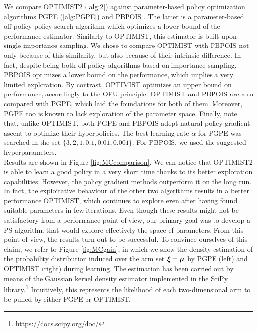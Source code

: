 We compare \gls{OPTIMIST}2 (\ref{alg:2}) against parameter-based policy optimization algorithms \gls{PGPE} (\ref{alg:PGPE}) and \gls{PBPOIS} \cite{metelli2018policy}. The latter is a parameter-based off-policy policy search algorithm which optimizes a lower bound of the performance estimator. Similarly to \gls{OPTIMIST}, this estimator is built upon single importance sampling. We chose to compare \gls{OPTIMIST} with \gls{PBPOIS} not only because of this similarity, but also because of their intrinsic difference. In fact, despite being both off-policy algorithms based on importance sampling, \gls{PBPOIS} optimizes a lower bound on the performance, which implies a very limited exploration. By contrast, \gls{OPTIMIST} optimizes an upper bound on performance, accordingly to the \gls{OFU} principle. \gls{OPTIMIST} and \gls{PBPOIS} are also compared with \gls{PGPE}, which laid the foundations for both of them. Moreover, \gls{PGPE} too is known to lack exploration of the parameter space. Finally, note that, unlike \gls{OPTIMIST}, both \gls{PGPE} and \gls{PBPOIS} adopt natural policy gradient ascent to optimize their hyperpolicies.
The best learning rate $\alpha$ for \gls{PGPE} was searched in the set $\{3, 2, 1, 0.1, 0.01, 0.001\}$. For \gls{PBPOIS}, we used the suggested hyperparameters. \\

Results are shown in Figure \ref{fig:MCcomparison}. We can notice that \gls{OPTIMIST}2 is able to learn a good policy in a very short time thanks to its better exploration capabilities. However, the policy gradient methods outperform it on the long run. In fact, the exploitative behaviour of the other two algorithms results in a better performance \wrt \gls{OPTIMIST}, which continues to explore even after having found suitable parameters in few iterations. Even though these results might not be satisfactory from a performance point of view, our primary goal was to develop a \gls{PS} algorithm that would explore effectively the space of parameters. From this point of view, the results turn out to be successful. To convince ourselves of this claim, we refer to Figure \ref{fig:MCgain}, in which we show the density estimation of the probability distribution induced over the arm set $\boldsymbol{\xi}=\boldsymbol{\mu}$ by \gls{PGPE} (left) and \gls{OPTIMIST} (right) during learning. The estimation has been carried out by means of the Gaussian kernel density estimator \cite{scott2015multivariate} implemented in the SciPy library.\footnote{https://docs.scipy.org/doc/} Intuitively, this represents the likelihood of each two-dimensional arm to be pulled by either \gls{PGPE} or \gls{OPTIMIST}. 

